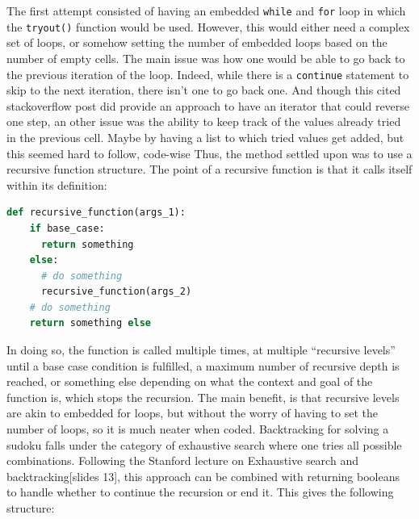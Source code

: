 \documentclass[12pt]{report} %
\begin{document}
The first attempt consisted of having an embedded \texttt{while} and \texttt{for} loop in which the \texttt{tryout()} function would be used. However, this would either need a complex set of loops, or somehow setting the number of embedded loops based on the number of empty cells. The main issue was how one would be able to go back to the previous iteration of the loop. Indeed, while there is a \texttt{continue} statement to skip to the next iteration, there isn't one to go back one\cite{stackoverflow_python_for_loop}. And though this cited stackoverflow post did provide an approach to have an iterator that could reverse one step, an other issue was the ability to keep track of the values already tried in the previous cell\cite{stackoverflow_python_for_loop}. Maybe by having a list to which tried values get added, but this seemed hard to follow, code-wise Thus, the method settled upon was to use a recursive function structure. The point of a recursive function is that it calls itself within its definition\cite{stackoverflow_recursion_python}:

\begin{lstlisting}[language=Python, caption = {Recursive function structure}]
  def recursive_function(args_1):
    if base_case:
      return something
    else:
      # do something
      recursive_function(args_2)
    # do something
    return something else
\end{lstlisting}

In doing so, the function is called multiple times, at multiple ``recursive levels'' until a base case condition is fulfilled, a maximum number of recursive depth is reached\cite{stackoverflow_recursion_depth}, or something else depending on what the context and goal of the function is, which stops the recursion. The main benefit, is  that recursive levels are akin to embedded for loops, but without the worry of having to set the number of loops, so it is much neater when coded.
Backtracking for solving a sudoku falls under the category of exhaustive search where one tries all possible combinations. Following the Stanford lecture on Exhaustive search and backtracking[slides 13]\cite{stanford_lecture}, this approach can be combined with returning booleans to handle whether to continue the recursion or end it. This gives the following structure:
\end{document}
